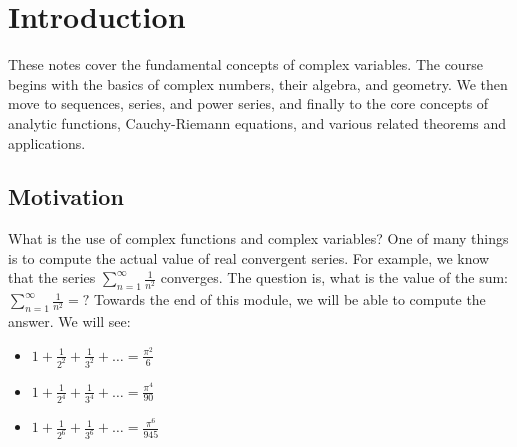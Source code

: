 
% 
% 
% 
% 
% 
% 
% 
% 
% 
% 
% 

\graphicspath{{./input/graphs/note01/}}

% 



\section{Introduction}

These notes cover the fundamental concepts of complex variables. The course begins with the basics of complex numbers, their algebra, and geometry.
We then move to sequences, series, and power series, and finally to the core concepts of analytic functions, Cauchy-Riemann equations, and various related theorems and applications.


\subsection{Motivation}

What is the use of complex functions and complex variables? One of many things is to compute the actual value of real convergent series. 
For example, we know that the series $\sum_{n=1}^\infty \frac{1}{n^2}$ converges.
The question is, what is the value of the sum:  $\sum_{n=1}^\infty \frac{1}{n^2} = ?$
Towards the end of this module, we will be able to compute the answer. We will see:

\begin{itemize}
    \item $1 + \frac{1}{2^2} + \frac{1}{3^2} + \dots = \frac{\pi^2}{6}$
    \item $1 + \frac{1}{2^4} + \frac{1}{3^4} + \dots = \frac{\pi^4}{90}$
    \item $1 + \frac{1}{2^6} + \frac{1}{3^6} + \dots = \frac{\pi^6}{945}$
\end{itemize}

